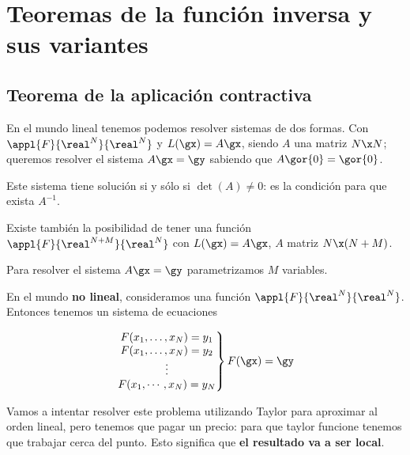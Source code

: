 \chapter{Teoremas de la función inversa y sus variantes}

\section{Teorema de la aplicación contractiva}

En el mundo lineal tenemos podemos resolver sistemas de dos formas. Con $\appl{F}{\real^N}{\real^N}$ y $L(\gx) = A\gx$, siendo $A$ una matriz $N\x N$; queremos resolver el sistema $A\gx = \gy$ sabiendo que $A\gor{0} = \gor{0}$.

Este sistema tiene solución si y sólo si  $\det(A) \neq 0$: es la condición para que exista $A^{-1}$.

Existe también la posibilidad de tener una función $\appl{F}{\real^{N+M}}{\real^N}$ con $L(\gx) = A\gx$, $A$ matriz $N\x (N+M)$.

Para resolver el sistema $A\gx = \gy$ parametrizamos $M$ variables.

En el mundo \textbf{no lineal}, consideramos una función $\appl{F}{\real^N}{\real^N}$. Entonces tenemos un sistema de ecuaciones

\[ \left.\begin{matrix}
F(x_1,\dotsc,x_N) = y_1\\
F(x_1,\dotsc,x_N) = y_2\\
\vdots\\
F(x_1,\cdots,x_N) = y_N          
        \end{matrix}
\right\} F(\gx)=\gy \]

Vamos a intentar resolver este problema utilizando Taylor para aproximar al orden lineal, pero tenemos que pagar un precio: para que taylor funcione tenemos que trabajar cerca del punto. Esto significa que \textbf{el resultado va a ser local}.


